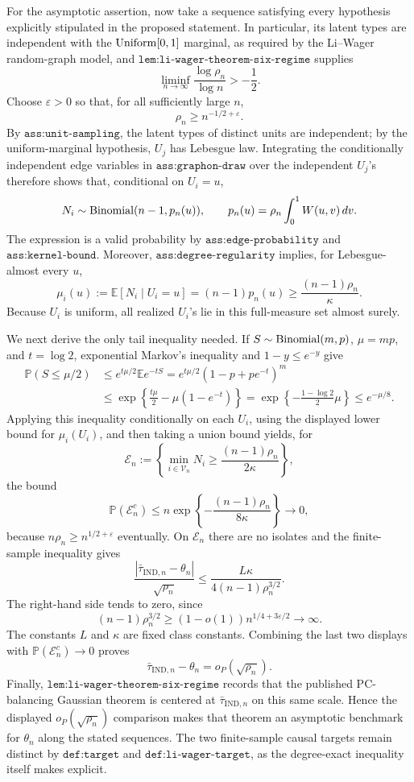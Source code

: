 For the asymptotic assertion, now take a sequence satisfying every hypothesis explicitly stipulated in the proposed statement.  In particular, its latent types are independent with the \({\rm Uniform}[0,1]\) marginal, as required by the Li--Wager random-graph model, and \(\texttt{lem:li-wager-theorem-six-regime}\) supplies
\[
\liminf_{n\to\infty}\frac{\log\rho_n}{\log n}>-\frac12.
\]
Choose \(\varepsilon>0\) so that, for all sufficiently large \(n\),
\[
\rho_n\ge n^{-1/2+\varepsilon}.
\]
By \(\texttt{ass:unit-sampling}\), the latent types of distinct units are independent; by the uniform-marginal hypothesis, \(U_j\) has Lebesgue law.  Integrating the conditionally independent edge variables in \(\texttt{ass:graphon-draw}\) over the independent \(U_j\)'s therefore shows that, conditional on \(U_i=u\),
\[
N_i\sim {\rm Binomial}(n-1,p_n(u)),
\qquad
p_n(u)=\rho_n\int_0^1W(u,v)\,dv.
\]
The expression is a valid probability by \(\texttt{ass:edge-probability}\) and \(\texttt{ass:kernel-bound}\).  Moreover, \(\texttt{ass:degree-regularity}\) implies, for Lebesgue-almost every \(u\),
\[
\mu_i(u):=\mathbb E[N_i\mid U_i=u]
=(n-1)p_n(u)
\ge \frac{(n-1)\rho_n}{\kappa}.
\]
Because \(U_i\) is uniform, all realized \(U_i\)'s lie in this full-measure set almost surely.

We next derive the only tail inequality needed.  If \(S\sim{\rm Binomial}(m,p)\), \(\mu=mp\), and \(t=\log2\), exponential Markov's inequality and \(1-y\le e^{-y}\) give
\[
\begin{aligned}
\mathbb P(S\le\mu/2)
&\le e^{t\mu/2}\mathbb E e^{-tS}
=e^{t\mu/2}(1-p+pe^{-t})^m\\
&\le \exp\!\left\{\frac{t\mu}{2}-\mu(1-e^{-t})\right\}
=\exp\!\left\{-\frac{1-\log2}{2}\mu\right\}
\le e^{-\mu/8}.
\end{aligned}
\]
Applying this inequality conditionally on each \(U_i\), using the displayed lower bound for \(\mu_i(U_i)\), and then taking a union bound yields, for
\[
\mathcal E_n:=\left\{\min_{i\in\mathcal V_n}N_i\ge\frac{(n-1)\rho_n}{2\kappa}\right\},
\]
the bound
\[
\mathbb P(\mathcal E_n^c)
\le n\exp\!\left\{-\frac{(n-1)\rho_n}{8\kappa}\right\}
\longrightarrow0,
\]
because \(n\rho_n\ge n^{1/2+\varepsilon}\) eventually.  On \(\mathcal E_n\) there are no isolates and the finite-sample inequality gives
\[
\frac{|\bar\tau_{\mathrm{IND},n}-\theta_n|}{\sqrt{\rho_n}}
\le \frac{L\kappa}{4(n-1)\rho_n^{3/2}}.
\]
The right-hand side tends to zero, since
\[
(n-1)\rho_n^{3/2}
\ge (1-o(1))n^{1/4+3\varepsilon/2}
\longrightarrow\infty.
\]
The constants \(L\) and \(\kappa\) are fixed class constants.  Combining the last two displays with \(\mathbb P(\mathcal E_n^c)\to0\) proves
\[
\bar\tau_{\mathrm{IND},n}-\theta_n=o_P(\sqrt{\rho_n}).
\]
Finally, \(\texttt{lem:li-wager-theorem-six-regime}\) records that the published PC-balancing Gaussian theorem is centered at \(\bar\tau_{\mathrm{IND},n}\) on this same scale.  Hence the displayed \(o_P(\sqrt{\rho_n})\) comparison makes that theorem an asymptotic benchmark for \(\theta_n\) along the stated sequences.  The two finite-sample causal targets remain distinct by \(\texttt{def:target}\) and \(\texttt{def:li-wager-target}\), as the degree-exact inequality itself makes explicit.